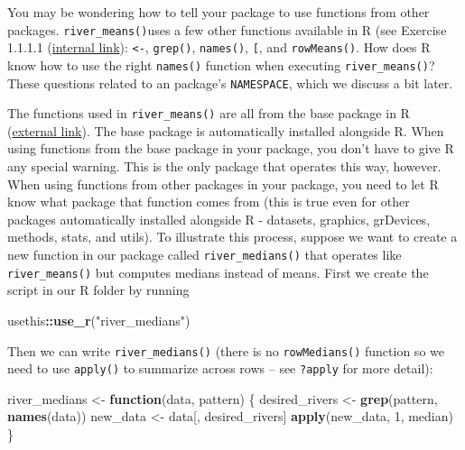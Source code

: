 \documentclass[
]{book}
\newenvironment{Shaded}{\begin{snugshade}}{\end{snugshade}}
\newcommand{\ControlFlowTok}[1]{\textcolor[rgb]{0.13,0.29,0.53}{\textbf{#1}}}
\newcommand{\DecValTok}[1]{\textcolor[rgb]{0.00,0.00,0.81}{#1}}
\newcommand{\KeywordTok}[1]{\textcolor[rgb]{0.13,0.29,0.53}{\textbf{#1}}}
\newcommand{\NormalTok}[1]{#1}
\newcommand{\OperatorTok}[1]{\textcolor[rgb]{0.81,0.36,0.00}{\textbf{#1}}}
\newcommand{\StringTok}[1]{\textcolor[rgb]{0.31,0.60,0.02}{#1}}
\begin{document}
You may be wondering how to tell your package to use functions from other packages. \texttt{river\_means()}uses a few other functions available in R (see Exercise 1.1.1.1 (\protect\hyperlink{ex-set1}{internal link}): \texttt{\textless{}-}, \texttt{grep()}, \texttt{names()}, \texttt{{[}}, and \texttt{rowMeans()}. How does R know how to use the right \texttt{names()} function when executing \texttt{river\_means()}? These questions related to an package's \texttt{NAMESPACE}, which we discuss a bit later.

The functions used in \texttt{river\_means()} are all from the base package in R (\href{https://stat.ethz.ch/R-manual/R-devel/library/base/html/00Index.html}{external link}). The base package is automatically installed alongside R. When using functions from the base package in your package, you don't have to give R any special warning. This is the only package that operates this way, however. When using functions from other packages in your package, you need to let R know what package that function comes from (this is true even for other packages automatically installed alongside R - datasets, graphics, grDevices, methods, stats, and utils). To illustrate this process, suppose we want to create a new function in our package called \texttt{river\_medians()} that operates like \texttt{river\_means()} but computes medians instead of means. First we create the script in our R folder by running

\begin{Shaded}
\begin{Highlighting}[]
\NormalTok{usethis}\OperatorTok{::}\KeywordTok{use_r}\NormalTok{(}\StringTok{"river_medians"}\NormalTok{)}
\end{Highlighting}
\end{Shaded}

Then we can write \texttt{river\_medians()} (there is no \texttt{rowMedians()} function so we need to use \texttt{apply()} to summarize across rows -- see \texttt{?apply} for more detail):

\begin{Shaded}
\begin{Highlighting}[]
\NormalTok{river_medians <-}\StringTok{ }\ControlFlowTok{function}\NormalTok{(data, pattern) \{}
\NormalTok{  desired_rivers <-}\StringTok{ }\KeywordTok{grep}\NormalTok{(pattern, }\KeywordTok{names}\NormalTok{(data))}
\NormalTok{  new_data <-}\StringTok{ }\NormalTok{data[, desired_rivers]}
  \KeywordTok{apply}\NormalTok{(new_data, }\DecValTok{1}\NormalTok{, median)}
\NormalTok{\}}
\end{Highlighting}
\end{Shaded}
\end{document}
